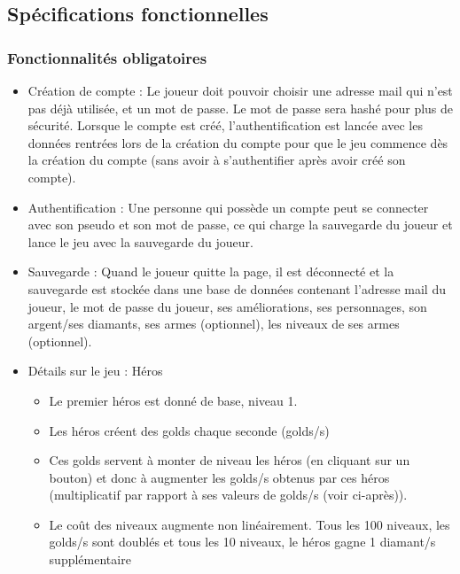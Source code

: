\subsection{Spécifications fonctionnelles}

    \subsubsection{Fonctionnalités obligatoires}

        \begin{itemize}
            \item Création de compte : Le joueur doit pouvoir choisir une adresse mail qui n’est pas déjà utilisée, et un mot de passe. Le mot de passe sera hashé pour plus de sécurité. Lorsque le compte est créé, l’authentification est lancée avec les données rentrées lors de la création du compte pour que le jeu commence dès la création du compte (sans avoir à s’authentifier après avoir créé son compte).

            \item Authentification : Une personne qui possède un compte peut se connecter avec son pseudo et son mot de passe, ce qui charge la sauvegarde du joueur et lance le jeu avec la sauvegarde du joueur.


            \item Sauvegarde : Quand le joueur quitte la page, il est déconnecté et la sauvegarde est stockée dans une base de données contenant l’adresse mail du joueur, le mot de passe du joueur, ses améliorations, ses personnages, son argent/ses diamants, ses armes (optionnel), les niveaux de ses armes (optionnel).

            \item  Détails sur le jeu : Héros

            \begin{itemize}
                \item Le premier héros est donné de base, niveau 1.

                \item Les héros créent des golds chaque seconde (golds/s)

                \item Ces golds servent à monter de niveau les héros (en cliquant sur un bouton) et donc à augmenter les golds/s obtenus par ces héros (multiplicatif par rapport à ses valeurs de golds/s (voir ci-après)).

                \item Le coût des niveaux augmente non linéairement. Tous les 100 niveaux, les golds/s sont doublés et tous les 10 niveaux, le héros gagne 1 diamant/s supplémentaire


\end{itemize}
\end{itemize}
